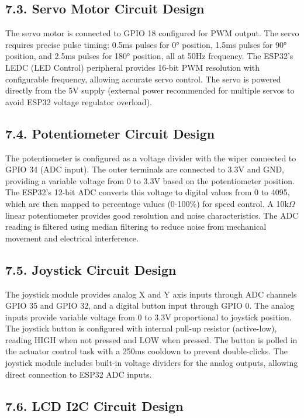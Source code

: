 \documentclass[12pt]{article}
\begin{document}
\subsection*{7.3. Servo Motor Circuit Design}

The servo motor is connected to GPIO 18 configured for PWM output. The servo requires precise pulse timing: 0.5ms pulses for 0° position, 1.5ms pulses for 90° position, and 2.5ms pulses for 180° position, all at 50Hz frequency. The ESP32's LEDC (LED Control) peripheral provides 16-bit PWM resolution with configurable frequency, allowing accurate servo control. The servo is powered directly from the 5V supply (external power recommended for multiple servos to avoid ESP32 voltage regulator overload).

\subsection*{7.4. Potentiometer Circuit Design}

The potentiometer is configured as a voltage divider with the wiper connected to GPIO 34 (ADC input). The outer terminals are connected to 3.3V and GND, providing a variable voltage from 0 to 3.3V based on the potentiometer position. The ESP32's 12-bit ADC converts this voltage to digital values from 0 to 4095, which are then mapped to percentage values (0-100\%) for speed control. A 10k$\Omega$ linear potentiometer provides good resolution and noise characteristics. The ADC reading is filtered using median filtering to reduce noise from mechanical movement and electrical interference.

\subsection*{7.5. Joystick Circuit Design}

The joystick module provides analog X and Y axis inputs through ADC channels GPIO 35 and GPIO 32, and a digital button input through GPIO 0. The analog inputs provide variable voltage from 0 to 3.3V proportional to joystick position. The joystick button is configured with internal pull-up resistor (active-low), reading HIGH when not pressed and LOW when pressed. The button is polled in the actuator control task with a 250ms cooldown to prevent double-clicks. The joystick module includes built-in voltage dividers for the analog outputs, allowing direct connection to ESP32 ADC inputs.

\subsection*{7.6. LCD I2C Circuit Design}
\end{document}
